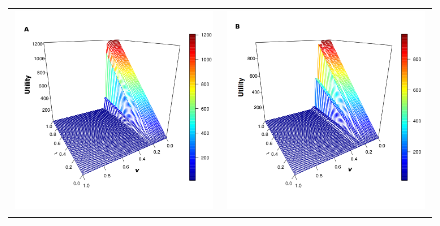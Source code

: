 \documentclass[11pt]{article}
\begin{document}
\begin{figure} [h!]
\centering
\begin{tabular}{cc}

\includegraphics[scale=0.28]{images/erdos_fitness_nus_1.png} & \includegraphics[scale=0.28]{images/watts_fitness_nus_1.png} \\

\end{tabular}
\end{figure}
\end{document}

